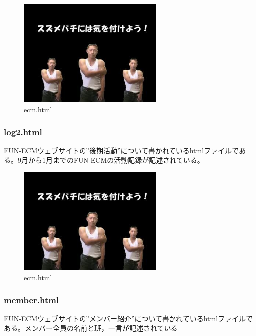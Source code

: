 \documentclass[openany,11pt,papersize]{jsbook}
\begin{document}
\begin{figure}[H]
  \begin{center} %
    \includegraphics[clip, width=7.0cm]{./figure/smile.png}
    \caption{ecm.html} %
    \label{ecm} %
  \end{center}
\end{figure}

\subsubsection{log2.html}
FUN-ECMウェブサイトの”後期活動”について書かれているhtmlファイルである。9月から1月までのFUN-ECMの活動記録が記述されている。

\begin{figure}[H]
  \begin{center} %
    \includegraphics[clip, width=7.0cm]{./figure/smile.png}
    \caption{ecm.html} %
    \label{ecm} %
  \end{center}
\end{figure}

\subsubsection{member.html}
FUN-ECMウェブサイトの”メンバー紹介”について書かれているhtmlファイルである。メンバー全員の名前と班，一言が記述されている
\end{document}
